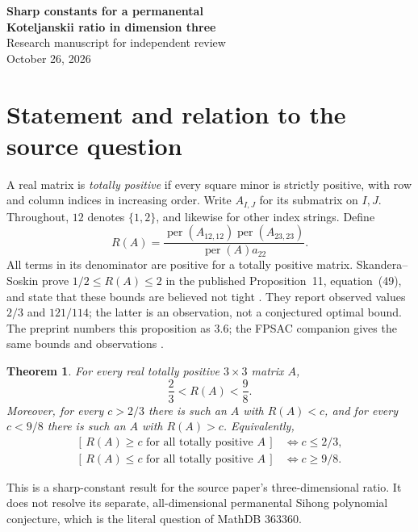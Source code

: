 \documentclass[11pt]{article}
\newtheorem{theorem}{Theorem}
\newcommand{\per}{\operatorname{per}}
\begin{document}
\begin{center}
{\Large\bfseries Sharp constants for a permanental\\Koteljanskii ratio in dimension three}\\[.5em]
Research manuscript for independent review\\
October 26, 2026
\end{center}
\begin{abstract}
For every real totally positive $3\times3$ matrix $A$, we prove
\[
 \frac23<\frac{\per(A_{12,12})\per(A_{23,23})}{\per(A)a_{22}}<\frac98.
\]
Both constants are optimal within the strictly totally positive class and
are not attained there. Positive row and column scaling reduces the proof
to two explicit polynomial positivity certificates in four variables.
Strictly totally positive one-parameter families approach both bounds.
The result sharpens the bounds $1/2$ and $2$ in Skandera--Soskin,
Proposition~11. Known failures of a permanental Koteljanskii inequality
and previously displayed endpoint examples are not claimed as new.
\end{abstract}

\section{Statement and relation to the source question}
A real matrix is \emph{totally positive} if every square minor is strictly
positive, with row and column indices in increasing order. Write
$A_{I,J}$ for its submatrix on $I,J$. Throughout, $12$ denotes $\{1,2\}$,
and likewise for other index strings. Define
\[
 R(A)=\frac{\per(A_{12,12})\per(A_{23,23})}{\per(A)a_{22}}.
\]
All terms in its denominator are positive for a totally positive matrix.
Skandera--Soskin prove $1/2\le R(A)\le2$ in the published
Proposition~11, equation~(49), and state that these bounds are believed
not tight \cite[p.~13]{SS25}. They report observed values $2/3$ and
$121/114$; the latter is an observation, not a conjectured optimal bound.
The preprint numbers this proposition as 3.6; the FPSAC companion gives
the same bounds and observations \cite{SSfpsac}.
\begin{theorem}\label{main}
For every real totally positive $3\times3$ matrix $A$,
\[
                         \frac23<R(A)<\frac98.
\]
Moreover, for every $c>2/3$ there is such an $A$ with $R(A)<c$, and for
every $c<9/8$ there is such an $A$ with $R(A)>c$. Equivalently,
\[
\begin{split}
 [\,R(A)\ge c\text{ for all totally positive }A\,]&\iff c\le2/3,\\
 [\,R(A)\le c\text{ for all totally positive }A\,]&\iff c\ge9/8.
\end{split}
\]
\end{theorem}
This is a sharp-constant result for the source paper's three-dimensional
ratio. It does not resolve its separate, all-dimensional permanental
Sihong polynomial conjecture, which is the literal question of MathDB
363360.
\end{document}
